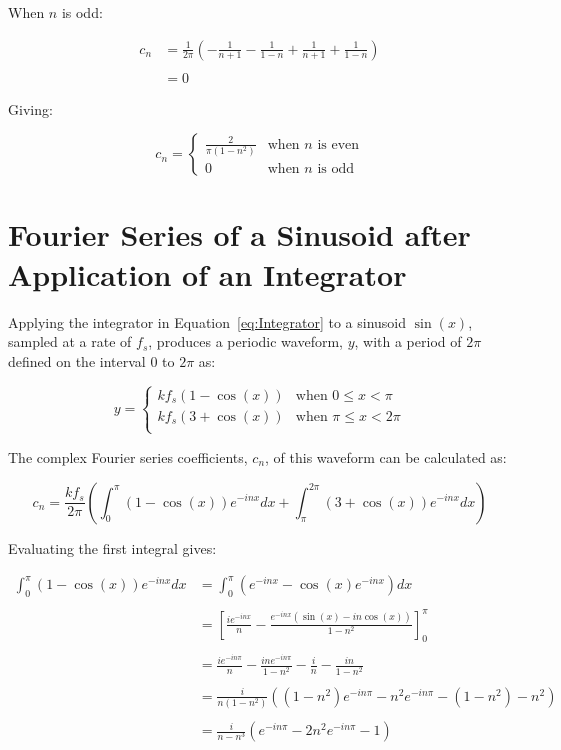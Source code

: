 \begin{appendices}
		When $n$ is odd:

		\begin{align}
			c_{n} & = \frac{1}{2\pi} \left( -\frac{1}{n+1} - 
				\frac{1}{1-n} + \frac{1}{n+1} + \frac{1}{1-n} \right) \nonumber \\
			\nonumber \\
			& = 0 \nonumber
		\end{align}

		Giving:

		\[ c_{n} = \begin{cases}
				\frac{2}{\pi(1 - n^{2})} & \text{when $n$ is even} \\
				0 & \text{when $n$ is odd}
			\end{cases} \]

	\section{Fourier Series of a Sinusoid after Application of an Integrator}
	\label{app:MathematicalDerivations-Integrator}
		Applying the integrator in Equation~\ref{eq:Integrator} to a sinusoid $\sin(x)$, sampled at a rate of
		$f_{s}$, produces a periodic waveform, $y$, with a period of $2\pi$ defined on the interval $0$ to $2\pi$
		as:

		\[ y = \begin{cases}
				kf_{s} (1 - \cos(x)) & \text{when $0 \leq x < \pi$} \\
				kf_{s} (3 + \cos(x)) & \text{when $\pi \leq x < 2\pi$} \\
			\end{cases} \]

		The complex Fourier series coefficients, $c_{n}$, of this waveform can be calculated as:

		\[ c_{n} = \frac{kf_{s}}{2\pi} \left( \int_{0}^{\pi} (1-\cos(x))e^{-inx} dx
						      + \int_{\pi}^{2\pi} (3 + \cos(x))e^{-inx} dx \right) \]

		Evaluating the first integral gives:
		
		\begin{align}
			\int_{0}^{\pi} (1-\cos(x))e^{-inx} dx & = 
				\int_{0}^{\pi} \left( e^{-inx} - \cos(x)e^{-inx} \right) dx \nonumber \\
			\nonumber \\
			& = \left[ \frac{ie^{-inx}}{n} - \frac{e^{-inx}(\sin(x) 
				- in\cos(x))}{1 - n^{2}} \right]_{0}^{\pi} \nonumber \\
			\nonumber \\
			& = \frac{ie^{-in\pi}}{n} - \frac{ine^{-in\pi}}{1 - n^{2}} 
				- \frac{i}{n} - \frac{in}{1 - n^{2}} \nonumber \\
			\nonumber \\
			& = \frac{i}{n(1-n^{2})} \left( (1 - n^{2})e^{-in\pi} - 
				n^{2}e^{-in\pi} - (1 - n^{2}) - n^2 \right) \nonumber \\
			\nonumber \\
			& = \frac{i}{n - n^{3}} \left( e^{-in\pi} - 2n^{2}e^{-in\pi} - 1 \right) \nonumber
		\end{align}


\end{appendices}
